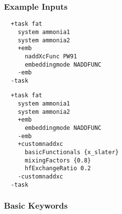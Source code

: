 \subsubsection{Example Inputs}
\begin{lstlisting}
  +task fat
    system ammonia1
    system ammonia2
    +emb
      naddXcFunc PW91
      embeddingmode NADDFUNC
    -emb
  -task
\end{lstlisting}
\begin{lstlisting}
  +task fat
    system ammonia1
    system ammonia2
    +emb
      embeddingmode NADDFUNC
    -emb
    +customnaddxc
      basicFunctionals {x_slater}
      mixingFactors {0.8}
      hfExchangeRatio 0.2
    -customnaddxc
  -task
\end{lstlisting}
\subsubsection{Basic Keywords}
